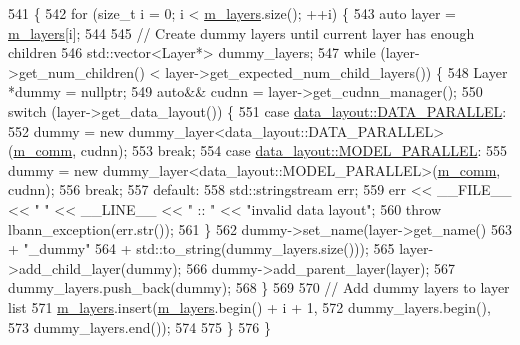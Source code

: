\begin{DoxyCode}
541                              \{
542   \textcolor{keywordflow}{for} (\textcolor{keywordtype}{size\_t} i = 0; i < \hyperlink{classlbann_1_1model_a0229fc226ec163d1411548446104569d}{m\_layers}.size(); ++i) \{
543     \textcolor{keyword}{auto} layer = \hyperlink{classlbann_1_1model_a0229fc226ec163d1411548446104569d}{m\_layers}[i];
544 
545     \textcolor{comment}{// Create dummy layers until current layer has enough children}
546     std::vector<Layer*> dummy\_layers;
547     \textcolor{keywordflow}{while} (layer->get\_num\_children() < layer->get\_expected\_num\_child\_layers()) \{
548       Layer *dummy = \textcolor{keyword}{nullptr};
549       \textcolor{keyword}{auto}&& cudnn = layer->get\_cudnn\_manager();
550       \textcolor{keywordflow}{switch} (layer->get\_data\_layout()) \{
551       \textcolor{keywordflow}{case} \hyperlink{base_8hpp_a786677cbfb3f5677b4d84f3056eb08dba37d2a3465f7cbf4ab60f4e79944d0638}{data\_layout::DATA\_PARALLEL}:
552         dummy = \textcolor{keyword}{new} dummy\_layer<data\_layout::DATA\_PARALLEL>(\hyperlink{classlbann_1_1model_a0eabaf2b2f829fd5db3dfd26df420df0}{m\_comm}, cudnn);
553         \textcolor{keywordflow}{break};
554       \textcolor{keywordflow}{case} \hyperlink{base_8hpp_a786677cbfb3f5677b4d84f3056eb08dbac94d7b0e44ab8bdcdad694a673cdeae0}{data\_layout::MODEL\_PARALLEL}:
555         dummy = \textcolor{keyword}{new} dummy\_layer<data\_layout::MODEL\_PARALLEL>(\hyperlink{classlbann_1_1model_a0eabaf2b2f829fd5db3dfd26df420df0}{m\_comm}, cudnn);
556         \textcolor{keywordflow}{break};
557       \textcolor{keywordflow}{default}:
558         std::stringstream err;
559         err << \_\_FILE\_\_ << \textcolor{stringliteral}{" "} << \_\_LINE\_\_ << \textcolor{stringliteral}{" :: "} << \textcolor{stringliteral}{"invalid data layout"};
560         \textcolor{keywordflow}{throw} lbann\_exception(err.str());
561       \}
562       dummy->set\_name(layer->get\_name()
563                       + \textcolor{stringliteral}{"\_dummy"}
564                       + std::to\_string(dummy\_layers.size()));
565       layer->add\_child\_layer(dummy);
566       dummy->add\_parent\_layer(layer);
567       dummy\_layers.push\_back(dummy);
568     \}
569 
570     \textcolor{comment}{// Add dummy layers to layer list}
571     \hyperlink{classlbann_1_1model_a0229fc226ec163d1411548446104569d}{m\_layers}.insert(\hyperlink{classlbann_1_1model_a0229fc226ec163d1411548446104569d}{m\_layers}.begin() + i + 1,
572                     dummy\_layers.begin(),
573                     dummy\_layers.end());
574 
575   \}
576 \}
\end{DoxyCode}
